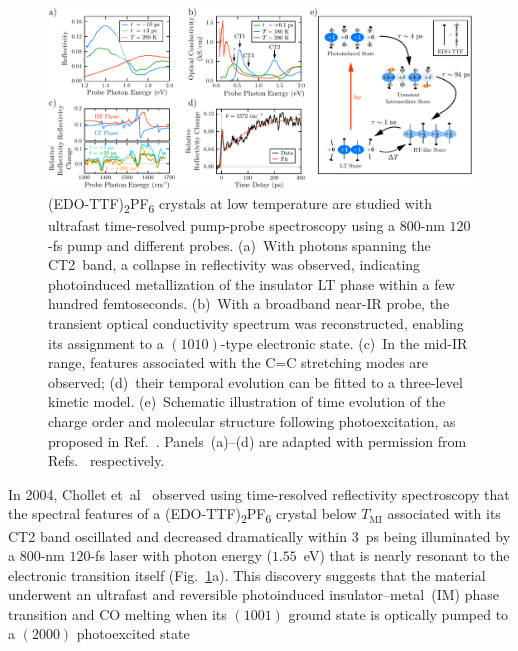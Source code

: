 \begin{figure}[ht!]
  \centering
  \includegraphics[width = \textwidth]{Figures/fig_EDO_time-resolved.pdf}
  \caption[Ultrafast time-resolved pump-probe spectroscopy in
  (EDO-TTF)\textsubscript{2}PF\textsubscript{6}.]{
  (EDO-TTF)\textsubscript{2}PF\textsubscript{6} crystals at low temperature
  are studied with ultrafast time-resolved pump-probe spectroscopy
  using a $800$-nm $120$-fs pump and different probes.
  (a)~With photons spanning the CT2~band, a collapse in reflectivity was observed,
  indicating photoinduced metallization of the insulator LT phase within a few hundred femtoseconds.
  (b)~With a broadband near-IR probe, the transient optical conductivity spectrum was reconstructed,
  enabling its assignment to a $(1010)$-type electronic state.
  (c)~In the mid-IR range, features associated with the C=C stretching modes are observed;
  (d)~their temporal evolution can be fitted to a three-level kinetic model.
  (e)~Schematic illustration of time evolution of the charge order and molecular structure
  following photoexcitation, as proposed in Ref.~\cite{Fukazawa2012}.
  Panels~(a)--(d) are adapted with permission from Refs.~\cite{Chollet2004, Onda2008, Fukazawa2012, Onda2014}
  respectively.
  }
  \label{fig: EDO-time-resolved}
\end{figure}
%
In 2004, Chollet et~al~\cite{Chollet2004} observed using time-resolved reflectivity spectroscopy that
the spectral features of a (EDO-TTF)\textsubscript{2}PF\textsubscript{6} crystal below $T_\text{MI}$
associated with its CT2 band oscillated and decreased dramatically within $3$~ps
being illuminated by a $800$-nm $120$-fs laser with photon energy ($1.55$~eV)
that is nearly resonant to the electronic transition itself (Fig.~\ref{fig: EDO-time-resolved}a).
%
This discovery suggests that the material underwent an ultrafast and reversible photoinduced
insulator--metal~(IM) phase transition and CO melting
when its $(1001)$ ground state is optically pumped to a $(2000)$ photoexcited state
